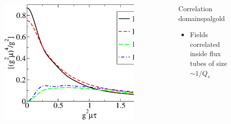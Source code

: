 \documentclass[aspectratio=169,11pt,usenames,dvipsnames]{beamer}
\begin{document}
\begin{frame}
\begin{columns}[onlytextwidth,t]
        \begin{center}
            \begin{figure}
                \centering
                \hspace{-5pt}\includegraphics[width=0.9\textwidth]{images/components.eps}
            \end{figure}
        \end{center}

        \begin{custombox2}{{\normalsize Correlation domains}}{palgold}
            \begin{varwidth}{0.99\columnwidth}
            \begin{itemize}\itemsep0em 
                \scriptsize
                \item Fields correlated inside flux tubes of size $\sim 1/Q_s$ 
            \end{itemize}
            \end{varwidth}
        \end{custombox2}
        

\end{columns}
\end{frame}
\end{document}
